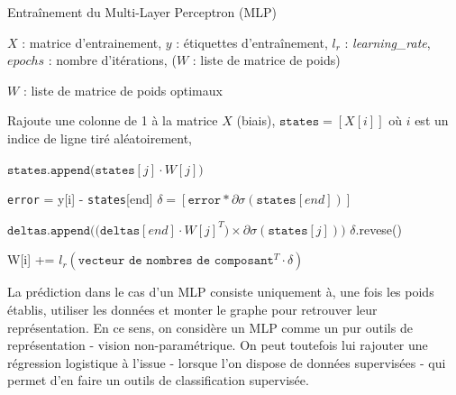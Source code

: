 \documentclass[10pt,a4paper]{article}
\begin{document}
\begin{algorithm}[ht!]
\caption{Entraînement du Multi-Layer Perceptron (MLP)}
\label{algoVince}
\begin{algorithmic}
\Require $X$ : matrice d'entrainement, $y$ : étiquettes d'entraînement, $l_r$ : \emph{learning\_rate}, $epochs$ : nombre d'itérations, ($W$ : liste de matrice de poids)

\Ensure $W$ : liste de matrice de poids optimaux

\State Rajoute une colonne de 1 à la matrice $X$ (biais),
	\State $\texttt{states} = [X[i]]$ où $i$ est un indice de ligne tiré aléatoirement,
	
		\State $\texttt{states.append(states}[j]\cdot W[j])$
	\EndFor
	
	\State \texttt{error} = y[i] - \texttt{states}[end]
	\State $\delta = [\texttt{error}*\partial\sigma(\texttt{states}[end])]$
		
		\State $\texttt{deltas.append((deltas}[end]\cdot W[j]^T) \times \partial \sigma(\texttt{states}[j]))$
	\EndFor
	\State $\delta .$revese()
	
		\State W[i] += $l_r(\texttt{vecteur de nombres de composant}^T\cdot \delta)$
	\EndFor
\EndFor
\end{algorithmic}
\end{algorithm}

La prédiction dans le cas d'un MLP consiste uniquement à, une fois les poids établis, utiliser les données et monter le graphe pour retrouver leur représentation. En ce sens, on considère un MLP comme un pur outils de représentation - vision non-paramétrique. On peut toutefois lui rajouter une régression logistique à l'issue - lorsque l'on dispose de données supervisées - qui permet d'en faire un outils de classification supervisée.  




\newpage



\end{document}
